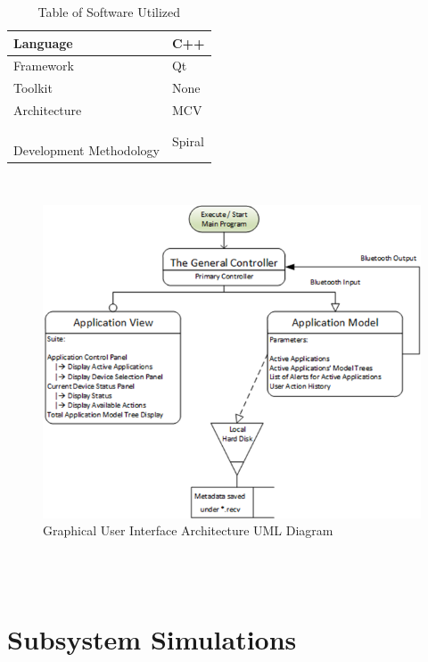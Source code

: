\documentclass[12pt]{article}
\begin{document}
\hfill
\begin{table}[h!]
\centering
\caption{Table of Software Utilized}
\begin{tabular}{| l | l |}
\hline
\parbox{0.17\linewidth}{\centering 
Language
} & \parbox{0.240\linewidth}{\centering 
C++
}\\ \hline
\parbox{0.17\linewidth}{\centering 
Framework
} & \parbox{0.240\linewidth}{\centering 
Qt
}\\ \hline
\parbox{0.17\linewidth}{\centering 
Toolkit
} & \parbox{0.240\linewidth}{\centering 
None
}\\ \hline
\parbox{0.17\linewidth}{\centering 
Architecture
} & \parbox{0.240\linewidth}{\centering 
MCV
}\\ \hline
\parbox{0.17\linewidth}{\centering \hfill \\
Development Methodology \\[0.5em]
} & \parbox{0.240\linewidth}{\centering 
Spiral
}\\ \hline
\end{tabular}
\end{table}
\hfill \\
\hfill
\begin{figure}[h!]
\centering
\includegraphics[width=0.9\linewidth]{gui_arch}
\caption{Graphical User Interface Architecture UML Diagram}
\end{figure}
\hfill \\
\pagebreak
\hfill \\
\pagebreak
\section{Subsystem Simulations}
\end{document}
